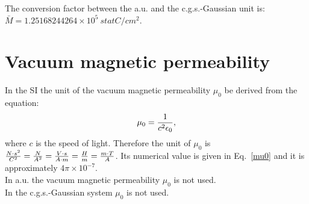 \documentclass[12pt,a4paper]{article}
\def\barmagcgs{1.25168244264\times 10^{5}}
\begin{document}
{\color{green} The conversion factor between the a.u. and the 
c.g.s.-Gaussian unit is:
$\bar M = \barmagcgs\ statC/cm^2$.
}


\newpage
\section{\color{coral}Vacuum magnetic permeability}
In the SI the unit of the vacuum magnetic permeability $\mu_0$
be derived from the equation: 
\begin{equation}
\mu_0={1\over c^2 \epsilon_0},
\end{equation}
where $c$ is the speed of light. Therefore the unit of $\mu_0$ is 
${N\cdot s^2 \over C^2}={N \over A^2}={V\cdot s \over A \cdot m}=
{H\over m}={m\cdot T \over A}$. Its numerical
value is given in Eq.~\ref{mu0} and it is approximately $4\pi\times 10^{-7}$.
\\

{\color{web-blue} In a.u. the vacuum magnetic permeability $\mu_0$ is not 
used.}
\\

{\color{orange} In the c.g.s.-Gaussian system $\mu_0$ is not used.
}
\\


\newpage
\end{document}
